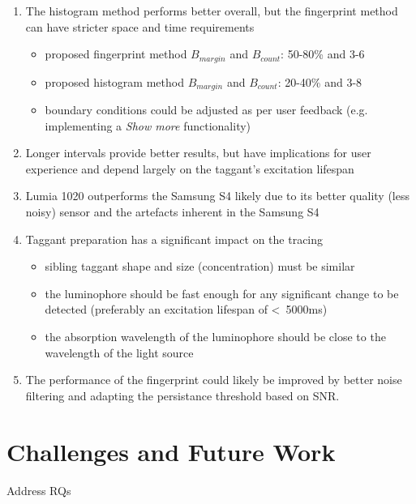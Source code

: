 \documentclass[thesis.tex]{subfiles}
\begin{document}
\begin{enumerate}
  \item The histogram method performs better overall, but the fingerprint method can have stricter space and time requirements
    \begin{itemize}
      \item proposed fingerprint method $B_{margin}$ and $B_{count}$: 50-80\% and 3-6
      \item proposed histogram method $B_{margin}$ and $B_{count}$: 20-40\% and 3-8
      \item boundary conditions could be adjusted as per user feedback (e.g. implementing a \emph{Show more} functionality)
    \end{itemize}
  \item Longer intervals provide better results, but have implications for user experience and depend largely on the taggant's excitation lifespan
  \item Lumia 1020 outperforms the Samsung S4 likely due to its better quality (less noisy) sensor and the artefacts inherent in the Samsung S4
  \item Taggant preparation has a significant impact on the tracing
    \begin{itemize}
      \item sibling taggant shape and size (concentration) must be similar
      \item the luminophore should be fast enough for any significant change to be detected (preferably an excitation lifespan of \textless\ 5000ms)
      \item the absorption wavelength of the luminophore should be close to the wavelength of the light source
    \end{itemize}
  \item The performance of the fingerprint could likely be improved by better noise filtering and adapting the persistance threshold based on SNR.
\end{enumerate}

\section{Challenges and Future Work}

Address RQs
\end{document}
